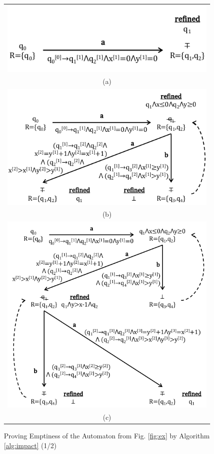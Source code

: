 \documentclass[10pt,conference,letterpaper,twocolumn]{IEEEtran}
\begin{document}
\begin{figure}[htb]
\vspace*{-\baselineskip}
\begin{tabular}{c}
\includegraphics[scale=0.65]{figures/IM1.pdf} \\[-2mm]
\tiny{(a)} \\
\includegraphics[scale=0.65]{figures/IM2.pdf} \\[-2mm]
\tiny{(b)} \\
\includegraphics[scale=0.65]{figures/IM3.pdf} \\[-2mm]
\tiny{(c)}
\end{tabular}
\vspace*{-0.5\baselineskip}
\caption{Proving Emptiness of the Automaton from Fig. \ref{fig:ex}
  by Algorithm \ref{alg:impact} (1/2)}
\label{fig:im1}
\end{figure}
\end{document}
